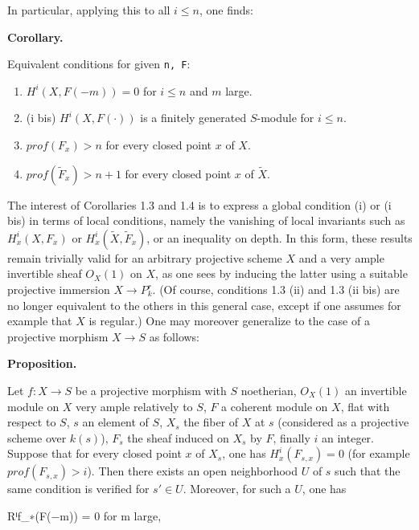 \documentclass[
  11pt,
  a4paper,
]{book}
\newenvironment{Shaded}{}{}
\newcommand{\NormalTok}[1]{#1}
\providecommand{\tightlist}{%
  \setlength{\itemsep}{0pt}\setlength{\parskip}{0pt}}
\begin{document}
In particular, applying this to all \(i \leqslant n\), one finds:

\textbf{Corollary.}

Equivalent conditions for given \texttt{n,\ F}:

\begin{enumerate}
\def\labelenumi{\arabic{enumi}.}
\tightlist
\item
  \(H^{i}(X, F(-m)) = 0\) for \(i \leqslant n\) and \(m\) large.
\item
  (i bis) \(H^{i}(X, F(\cdot))\) is a finitely generated \(S\)-module
  for \(i \leqslant n\).
\item
  \(prof(F_{x}) > n\) for every closed point \(x\) of \(X\).
\item
  \(prof(\tilde{F}_{x}) > n + 1\) for every closed point \(x\) of
  \(\tilde{X}\).
\end{enumerate}

The interest of Corollaries 1.3 and 1.4 is to express a global condition
(i) or (i bis) in terms of local conditions, namely the vanishing of
local invariants such as \(H^{i}_{x}(X, F_{x})\) or
\(H^{i}_{x}(\tilde{X}, \tilde{F}_{x})\), or an inequality on depth. In
this form, these results remain trivially valid for an arbitrary
projective scheme \(X\) and a very ample invertible sheaf \(O_{X}(1)\)
on \(X\), as one sees by inducing the latter using a suitable projective
immersion \(X \to P^{r}_{k}\). (Of course, conditions 1.3 (ii) and 1.3
(ii bis) are no longer equivalent to the others in this general case,
except if one assumes for example that \(X\) is regular.) One may
moreover generalize to the case of a projective morphism \(X \to S\) as
follows:

\textbf{Proposition.}

Let \(f: X \to S\) be a projective morphism with \(S\) noetherian,
\(O_{X}(1)\) an invertible module on \(X\) very ample relatively to
\(S\), \(F\) a coherent module on \(X\), flat with respect to \(S\),
\(s\) an element of \(S\), \(X_{s}\) the fiber of \(X\) at \(s\)
(considered as a projective scheme over \(k(s)\)), \(F_{s}\) the sheaf
induced on \(X_{s}\) by \(F\), finally \(i\) an integer. Suppose that
for every closed point \(x\) of \(X_{s}\), one has
\(H^{i}_{x}(F_{s,x}) = 0\) (for example \(prof(F_{s,x}) > i\)). Then
there exists an open neighborhood \(U\) of \(s\) such that the same
condition is verified for \(s'
\in U\). Moreover, for such a \(U\), one has

\begin{Shaded}
\begin{Highlighting}[]
\NormalTok{Rⁱf\_∗(F(−m)) = 0 for m large,}
\end{Highlighting}
\end{Shaded}
\end{document}
